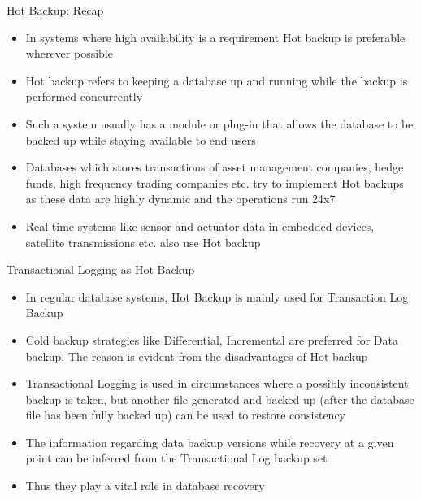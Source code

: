 \documentclass[aspectratio=169, xcolor=dvipsnames]{beamer}
\begin{document}
\begin{frame}{Hot Backup: Recap}
    \begin{itemize}[<+->]
        \item In systems where high availability is a requirement Hot backup is preferable wherever possible
        \item Hot backup refers to keeping a database up and running while the backup is performed concurrently
        \item Such a system usually has a module or plug-in that allows the database to be backed up while staying available to end users
        \item Databases which stores transactions of asset management companies, hedge funds, high frequency trading companies etc. try to implement Hot backups as these data are highly dynamic and the operations run 24x7
        \item Real time systems like sensor and actuator data in embedded devices, satellite transmissions etc. also use Hot backup
    \end{itemize}
\end{frame}

\begin{frame}{Transactional Logging as Hot Backup}
    \begin{itemize}[<+->]
        \item In regular database systems, Hot Backup is mainly used for Transaction Log Backup
        \item Cold backup strategies like Differential, Incremental are preferred for Data backup. The reason is evident from the disadvantages of Hot backup
        \item Transactional Logging is used in circumstances where a possibly inconsistent backup is taken, but another file generated and backed up (after the database file has been fully backed up) can be used to restore consistency
        \item The information regarding data backup versions while recovery at a given point can be inferred from the Transactional Log backup set
        \item Thus they play a vital role in database recovery
    \end{itemize}
\end{frame}
\end{document}
